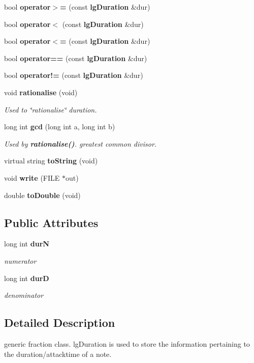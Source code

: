 \begin{CompactItemize}
bool {\bf operator$>$=} (const {\bf lg\-Duration} \&dur)
\item 
bool {\bf operator$<$} (const {\bf lg\-Duration} \&dur)
\item 
bool {\bf operator$<$=} (const {\bf lg\-Duration} \&dur)
\item 
bool {\bf operator==} (const {\bf lg\-Duration} \&dur)
\item 
bool {\bf operator!=} (const {\bf lg\-Duration} \&dur)
\item 
void {\bf rationalise} (void)
\begin{CompactList}\small\item\em Used to \char`\"{}rationalise\char`\"{} duration. \item\end{CompactList}\item 
long int {\bf gcd} (long int a, long int b)
\begin{CompactList}\small\item\em Used by {\bf rationalise()}. greatest common divisor. \item\end{CompactList}\item 
virtual string {\bf to\-String} (void)
\item 
void {\bf write} (FILE $\ast$out)
\item 
double {\bf to\-Double} (void)
\end{CompactItemize}
\subsection*{Public Attributes}
\begin{CompactItemize}
\item 
long int {\bf dur\-N}
\begin{CompactList}\small\item\em numerator \item\end{CompactList}\item 
long int {\bf dur\-D}
\begin{CompactList}\small\item\em denominator \item\end{CompactList}\end{CompactItemize}


\subsection{Detailed Description}
generic fraction class. lg\-Duration is used to store the information pertaining to the duration/attacktime of a note. 




